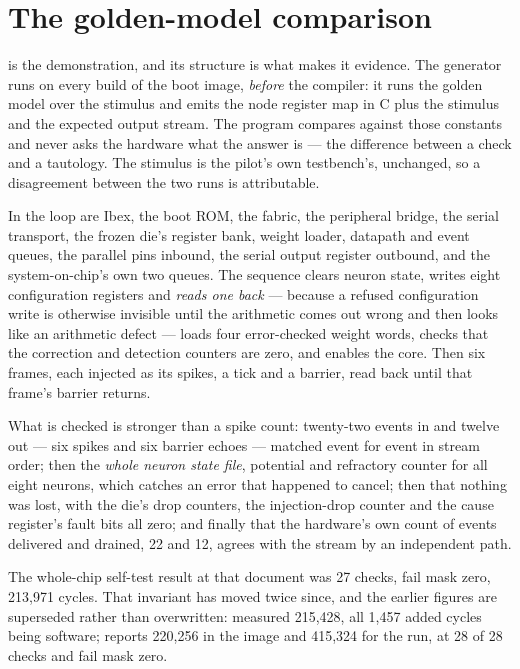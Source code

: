 \section{The golden-model comparison}

 is the demonstration, and its structure is what
makes it evidence. The generator 
runs on every build of the boot image, \emph{before} the compiler: it
runs the golden model  over the stimulus
and emits the node register map in C plus the stimulus and the expected
output stream. The program compares against those constants and never
asks the hardware what the answer is --- the difference between a check
and a tautology. The stimulus is the pilot's own testbench's, unchanged, so a
disagreement between the two runs is attributable.

In the loop are Ibex, the boot ROM, the fabric, the peripheral bridge,
the serial transport, the frozen die's register bank, weight loader,
datapath and event queues, the parallel pins inbound, the serial output
register outbound, and the system-on-chip's own two queues. The
sequence clears neuron state, writes eight configuration registers and
\emph{reads one back} --- because a refused configuration write is
otherwise invisible until the arithmetic comes out wrong and then looks
like an arithmetic defect --- loads four error-checked weight words,
checks that the correction and detection counters are zero, and enables
the core. Then six frames, each injected as its spikes, a tick and a
barrier, read back until that frame's barrier returns.

What is checked is stronger than a spike count: twenty-two events in
and twelve out --- six spikes and six barrier echoes --- matched event
for event in stream order; then the \emph{whole neuron state file},
potential and refractory counter for all eight neurons, which catches
an error that happened to cancel; then that nothing was lost, with the
die's drop counters, the injection-drop counter and the cause
register's fault bits all zero; and finally that the hardware's own
count of events delivered and drained, 22 and 12, agrees with the
stream by an independent path.

The whole-chip self-test result at that document was 27 checks, fail
mask zero, 213,971 cycles. That invariant has moved twice since, and
the earlier figures are superseded rather than overwritten:
 measured 215,428, all 1,457 added cycles being software;
 reports 220,256 in the image and 415,324 for the run, at
28 of 28 checks and fail mask zero.

